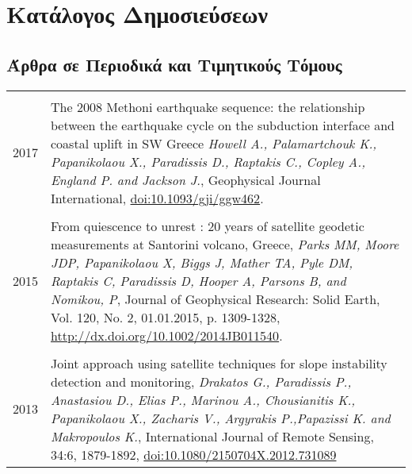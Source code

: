 \documentclass[a4paper,10pt]{article} %
\begin{document}
\section{Κατάλογος Δημοσιεύσεων}
\medskip

\subsection*{Άρθρα σε Περιοδικά και Τιμητικούς Τόμους}

\begin{longtable}{r|p{14cm}}

\multicolumn{2}{c}{} \\
  \textsc{2017}

  & The 2008 Methoni earthquake sequence: the relationship between the earthquake cycle on the subduction interface and coastal uplift in SW Greece
  \emph{Howell A., Palamartchouk K., Papanikolaou X., Paradissis D., Raptakis C., Copley A., England P. and Jackson J.}, Geophysical Journal International, \href{https://doi.org/10.1093/gji/ggw462}{doi:10.1093/gji/ggw462}.\\

\multicolumn{2}{c}{} \\
  \textsc{2015}

  & From quiescence to unrest : 20 years of satellite geodetic measurements at Santorini volcano, Greece,
  \emph{Parks MM, Moore JDP, Papanikolaou X, Biggs J, Mather TA, Pyle DM, Raptakis C, Paradissis D, Hooper A, Parsons B, and Nomikou, P}, Journal of Geophysical Research: Solid Earth, Vol. 120, No. 2, 01.01.2015, p. 1309-1328, \href{http://dx.doi.org/10.1002/2014JB011540}{http://dx.doi.org/10.1002/2014JB011540}.\\
  
\multicolumn{2}{c}{} \\ 
  \textsc{2013}

  & Joint approach using satellite techniques for slope instability detection and monitoring,
  \emph{Drakatos G., Paradissis P., Anastasiou D., Elias P., Marinou A., Chousianitis K., Papanikolaou X., Zacharis V., Argyrakis P.,Papazissi K. and Makropoulos K.},
  International Journal of Remote Sensing, 34:6, 1879-1892, \href{http://www.tandfonline.com/doi/abs/10.1080/2150704X.2012.731089#.Uxni9meIaig}{doi:10.1080/2150704X.2012.731089}\\


\end{longtable}
\end{document}
